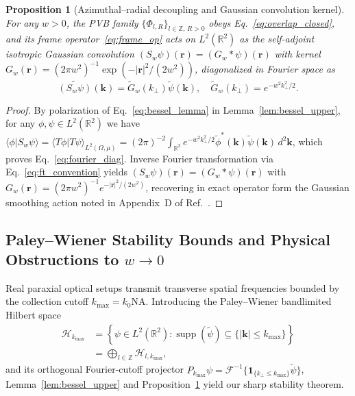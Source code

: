 \documentclass[aps,pra,onecolumn,notitlepage,11pt,tightenlines,amsmath,amssymb,floatfix,longbibliography]{revtex4-2}
\providecommand{\braket}[2]{\langle#1\vert#2\rangle}
\providecommand{\abs}[1]{\lvert#1\rvert}
\newtheorem{proposition}{Proposition}
\begin{document}
\begin{proposition}[Azimuthal--radial decoupling and Gaussian convolution kernel]
\label{prop:conv_kernel}
For any $w > 0$, the PVB family $\{\Phi_{l,R}\}_{l\in\mathbb{Z},\,R>0}$ obeys Eq.~\eqref{eq:overlap_closed}, and its frame operator~\eqref{eq:frame_op} acts on $L^2(\mathbb{R}^2)$ as the self-adjoint isotropic Gaussian convolution $(S_w\psi)(\mathbf{r}) = (G_w * \psi)(\mathbf{r})$ with kernel $G_w(\mathbf{r}) = (2\pi w^2)^{-1}\exp(-\abs{\mathbf{r}}^2/(2w^2))$, diagonalized in Fourier space as
\begin{equation}
\widetilde{(S_w\psi)}(\mathbf{k}) = \widetilde{G}_w(k_\perp)\widetilde{\psi}(\mathbf{k}), \quad \widetilde{G}_w(k_\perp) = e^{-w^2 k_\perp^2/2}.
\label{eq:fourier_diag}
\end{equation}
\end{proposition}
\begin{proof}
By polarization of Eq.~\eqref{eq:bessel_lemma} in Lemma~\ref{lem:bessel_upper}, for any $\phi,\psi \in L^2(\mathbb{R}^2)$ we have $\braket{\phi}{S_w\psi} = \braket{T\phi}{T\psi}_{L^2(\Omega,\mu)} = (2\pi)^{-2}\int_{\mathbb{R}^2} e^{-w^2 k_\perp^2/2}\widetilde{\phi}^*(\mathbf{k})\widetilde{\psi}(\mathbf{k})\,d^2\mathbf{k}$, which proves Eq.~\eqref{eq:fourier_diag}. Inverse Fourier transformation via Eq.~\eqref{eq:ft_convention} yields $(S_w\psi)(\mathbf{r}) = (G_w * \psi)(\mathbf{r})$ with $G_w(\mathbf{r}) = (2\pi w^2)^{-1}e^{-\abs{\mathbf{r}}^2/(2w^2)}$, recovering in exact operator form the Gaussian smoothing action noted in Appendix~D of Ref.~\cite{Ferreira2026}.
\end{proof}

\subsection{Paley--Wiener Stability Bounds and Physical Obstructions to \texorpdfstring{$w \to 0$}{w -> 0}}
\label{subsec:paley_wiener}

Real paraxial optical setups transmit transverse spatial frequencies bounded by the collection cutoff $k_{\max} = k_0 \mathrm{NA}$. Introducing the Paley--Wiener bandlimited Hilbert space
\begin{align}
\mathcal{H}_{k_{\max}} &= \left\{\psi \in L^2(\mathbb{R}^2) : \operatorname{supp}(\widetilde{\psi}) \subseteq \{\abs{\mathbf{k}} \le k_{\max}\}\right\} \nonumber \\
&= \bigoplus_{l\in\mathbb{Z}} \mathcal{H}_{l,k_{\max}},
\label{eq:paley_wiener}
\end{align}
and its orthogonal Fourier-cutoff projector $P_{k_{\max}}\psi = \mathcal{F}^{-1}\{\mathbf{1}_{\{k_\perp \le k_{\max}\}}\widetilde{\psi}\}$, Lemma~\ref{lem:bessel_upper} and Proposition~\ref{prop:conv_kernel} yield our sharp stability theorem.
\end{document}
